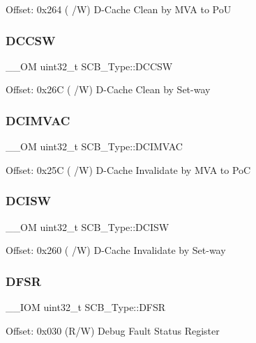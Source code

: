 Offset\+: 0x264 ( /W) D-\/\+Cache Clean by M\+VA to PoU \mbox{\label{structSCB__Type_ab95cc818be9fa7d25ae516f3fe6b7788}} 
\subsubsection{\texorpdfstring{DCCSW}{DCCSW}}
{\footnotesize\ttfamily \+\_\+\+\_\+\+OM uint32\+\_\+t S\+C\+B\+\_\+\+Type\+::\+D\+C\+C\+SW}

Offset\+: 0x26C ( /W) D-\/\+Cache Clean by Set-\/way \mbox{\label{structSCB__Type_a4be79491ab1ed14f3b0237ba7e69063c}} 
\subsubsection{\texorpdfstring{DCIMVAC}{DCIMVAC}}
{\footnotesize\ttfamily \+\_\+\+\_\+\+OM uint32\+\_\+t S\+C\+B\+\_\+\+Type\+::\+D\+C\+I\+M\+V\+AC}

Offset\+: 0x25C ( /W) D-\/\+Cache Invalidate by M\+VA to PoC \mbox{\label{structSCB__Type_a22bcfd7e1bffebdbe98cdbc8d77a2f42}} 
\subsubsection{\texorpdfstring{DCISW}{DCISW}}
{\footnotesize\ttfamily \+\_\+\+\_\+\+OM uint32\+\_\+t S\+C\+B\+\_\+\+Type\+::\+D\+C\+I\+SW}

Offset\+: 0x260 ( /W) D-\/\+Cache Invalidate by Set-\/way \mbox{\label{structSCB__Type_a191579bde0d21ff51d30a714fd887033}} 
\subsubsection{\texorpdfstring{DFSR}{DFSR}}
{\footnotesize\ttfamily \+\_\+\+\_\+\+I\+OM uint32\+\_\+t S\+C\+B\+\_\+\+Type\+::\+D\+F\+SR}

Offset\+: 0x030 (R/W) Debug Fault Status Register \mbox{\label{structSCB__Type_a2836e932734240076ce91cf4484cdf43}} 
